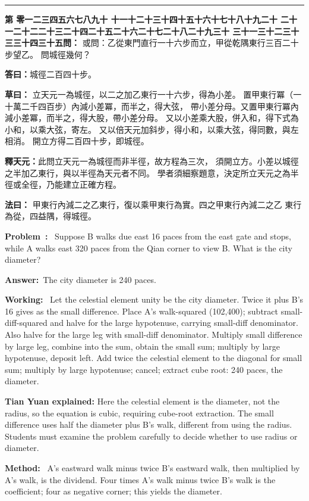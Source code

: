 \documentclass[9pt,a4paper]{article}
\newcounter{probnum}
\newcounter{overallnum}
\newcommand{\chnum}[1]{%
  \ifcase#1 零\or 一\or 二\or 三\or 四\or 五\or 六\or 七\or 八\or 九\or 十\or
    十一\or 十二\or 十三\or 十四\or 十五\or 十六\or 十七\or 十八\or 十九\or 二十\or
    二十一\or 二十二\or 二十三\or 二十四\or 二十五\or 二十六\or 二十七\or 二十八\or 二十九\or 三十\or
    三十一\or 三十二\or 三十三\or 三十四\or 三十五\fi}
\newcommand{\problem}[1]{\stepcounter{probnum}\stepcounter{overallnum}\par\noindent\textbf{\color{volcolor}第\chnum{\value{probnum}}問：}#1\par\vspace{0.15cm}}
\newcommand{\answer}[1]{\par\noindent\textbf{答曰：}#1\par\vspace{0.15cm}}
\newcommand{\working}[1]{\par\noindent\textbf{草曰：}#1\par\vspace{0.15cm}}
\newcommand{\method}[1]{\par\noindent\textbf{法曰：}#1\par\vspace{0.25cm}}
\newcommand{\eproblem}[1]{\par\noindent\textbf{\color{volcolor}Problem~\theoverallnum:}~#1\par\vspace{0.15cm}}
\newcommand{\eanswer}[1]{\par\noindent\textbf{Answer:}~#1\par\vspace{0.15cm}}
\newcommand{\eworking}[1]{\par\noindent\textbf{Working:}~#1\par\vspace{0.15cm}}
\newcommand{\emethod}[1]{\par\noindent\textbf{Method:}~#1\par\vspace{0.25cm}}
\newcommand{\tianyuan}[2]{\raisebox{-0.6ex}{\scriptsize$\begin{array}{c}#1\\\hline #2\end{array}$}}
\begin{document}
\vspace{0.15cm}
\noindent\rule{\textwidth}{0.2pt}
\vspace{0.15cm}

\noindent\begin{minipage}[t]{0.48\textwidth}
\problem{
或問：乙從東門直行一十六步而立，甲從乾隅東行三百二十步望乙。
問城徑幾何？
}

\answer{城徑二百四十步。}

\working{
立天元一為城徑，以二之加乙東行一十六步，得\tianyuan{16}{2}為小差。
置甲東行冪（一十萬二千四百步）內減小差冪，而半之，得大弦，
帶小差分母。又置甲東行冪內減小差冪，而半之，得大股，帶小差分母。
又以小差乘大股，併入和，得下式為小和，以乘大弦，寄左。
又以倍天元加斜步，得小和，以乘大弦，得同數，與左相消。
開立方得二百四十步，即城徑。

\textbf{釋天元：}此問立天元一為城徑而非半徑，故方程為三次，
須開立方。小差以城徑之半加乙東行，與以半徑為天元者不同。
學者須細察題意，決定所立天元之為半徑或全徑，乃能建立正確方程。
}

\method{
甲東行內減二之乙東行，復以乘甲東行為實。四之甲東行內減二之乙
東行為從，四益隅，得城徑。
}
\end{minipage}%
\hfill%
\begin{minipage}[t]{0.50\textwidth}
\eproblem{
Suppose B walks due east 16 paces from the east gate and stops, while A walks
east 320 paces from the Qian corner to view B. What is the city diameter?
}

\eanswer{The city diameter is 240 paces.}

\eworking{
Let the celestial element unity be the city diameter. Twice it plus B's 16
gives \tianyuan{16}{2} as the small difference. Place A's walk-squared
(102,400); subtract small-diff-squared and halve for the large hypotenuse,
carrying small-diff denominator. Also halve for the large leg with small-diff
denominator. Multiply small difference by large leg, combine into the sum,
obtain the small sum; multiply by large hypotenuse, deposit left. Add twice
the celestial element to the diagonal for small sum; multiply by large
hypotenuse; cancel; extract cube root: 240 paces, the diameter.

\textbf{Tian Yuan explained:} Here the celestial element is the diameter, not
the radius, so the equation is cubic, requiring cube-root extraction. The
small difference uses half the diameter plus B's walk, different from using
the radius. Students must examine the problem carefully to decide whether
to use radius or diameter.
}

\emethod{
A's eastward walk minus twice B's eastward walk, then multiplied by A's walk,
is the dividend. Four times A's walk minus twice B's walk is the coefficient;
four as negative corner; this yields the diameter.
}
\end{minipage}
\vspace{0.15cm}
\end{document}
